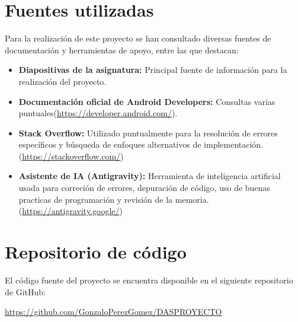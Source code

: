 \documentclass{article}
\begin{document}
\section{Fuentes utilizadas}

Para la realización de este proyecto se han consultado diversas fuentes de documentación y herramientas de apoyo, entre las que destacan:

\begin{itemize}
    \item \textbf{Diapositivas de la asignatura: } Principal fuente de información para la realización del proyecto.
    \item \textbf{Documentación oficial de Android Developers:} Consultas varias puntuales(\url{https://developer.android.com/}).
    \item \textbf{Stack Overflow:} Utilizado puntualmente para la resolución de errores específicos y búsqueda de enfoques alternativos de implementación.(\url{https://stackoverflow.com/})
    \item \textbf{Asistente de IA (Antigravity):} Herramienta de inteligencia artificial usada para correción de errores, depuración de código, uso de buenas practicas de programación y revisión de la memoria.(\url{https://antigravity.google/})
\end{itemize}

\section{Repositorio de código}

El código fuente del proyecto se encuentra disponible en el siguiente repositorio de GitHub:

\begin{center}
    \url{https://github.com/GonzaloPerezGomez/DASPROYECTO}
\end{center}
\end{document}
